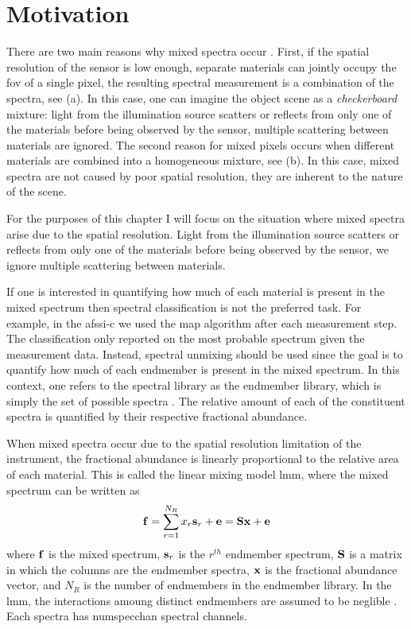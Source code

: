 \section{Motivation}

There are two main reasons why mixed spectra occur \cite{keshava2002spectral, keshava2003survey}. First, if the spatial resolution of the sensor is low enough, separate materials can jointly occupy the \acrfull{fov} of a single pixel, the resulting spectral measurement is a combination of the spectra, see (a). In this case, one can imagine the object scene as a \emph{checkerboard} mixture: light from the illumination source scatters or reflects from only one of the materials before being observed by the sensor, multiple scattering between materials are ignored. The second reason for mixed pixels occurs when different materials are combined into a homogeneous mixture, see (b). In this case, mixed spectra are not caused by poor spatial resolution, they are inherent to the nature of the scene.

For the purposes of this chapter I will focus on the situation where mixed spectra arise due to the spatial resolution. Light from the illumination source scatters or reflects from only one of the materials before being observed by the sensor, we ignore multiple scattering between materials. 

If one is interested in quantifying how much of each material is present in the \gls{mixed spectrum} then spectral classification is not the preferred task. For example, in the \gls{afssi-c} we used the \acrfull{map} algorithm after each measurement step. The classification only reported on the most probable spectrum given the measurement data. Instead, \gls{spectral unmixing} should be used since the goal is to quantify how much of each \gls{endmember} is present in the \gls{mixed spectrum}. In this context, one refers to the spectral library as the endmember library, which is simply the set of possible spectra \cite{lillesand2014remote}. The relative amount of each of the constituent spectra is quantified by their respective \gls{fractional abundance}. 

When mixed spectra occur due to the spatial resolution limitation of the instrument, the fractional abundance is linearly proportional to the relative area of each material. This is called the linear mixing model \gls{lmm}, where the mixed spectrum can be written as 
%
\begin{equation}
\displaystyle \mathbf{f} = \sum_{r=1}^{N_{R}} x_r \displaystyle \mathbf{s}_r + \displaystyle \mathbf{e} = \displaystyle \mathbf{S} \displaystyle \mathbf{x}  + \displaystyle \mathbf{e}
\end{equation}
%
where $\displaystyle \mathbf{f}$ is the \gls{mixed spectrum}, $\displaystyle \mathbf{s}_r$ is the $r^{th}$ endmember spectrum, $\displaystyle \mathbf{S}$ is a matrix in which the columns are the endmember spectra, $\displaystyle \mathbf{x}$ is the fractional abundance vector, and $N_{R}$ is the number of endmembers in the endmember library. In the \gls{lmm}, the interactions amoung distinct endmembers are assumed to be neglible \cite{clark1984reflectance}. Each spectra has \gls{numspecchan} spectral channels.

